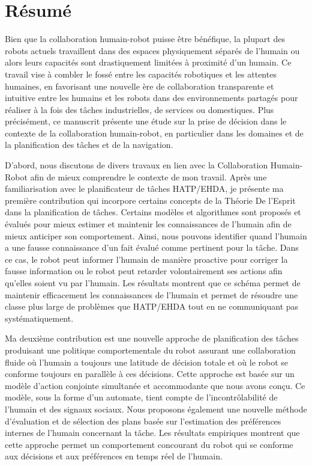 \chapter*{Résumé}

Bien que la collaboration humain-robot puisse être bénéfique, la plupart des robots actuels travaillent dans des espaces physiquement séparés de l'humain ou alors leurs capacités sont drastiquement limitées à proximité d'un humain. Ce travail vise à combler le fossé entre les capacités robotiques et les attentes humaines, en favorisant une nouvelle ère de collaboration transparente et intuitive entre les humains et les robots dans des environnements partagés pour réaliser à la fois des tâches industrielles, de services ou domestiques. Plus précisément, ce manuscrit présente une étude sur la prise de décision dans le contexte de la collaboration humain-robot, en particulier dans les domaines et de la planification des tâches et de la navigation.

D'abord, nous discutons de divers travaux en lien avec la Collaboration Humain-Robot afin de mieux comprendre le contexte de mon travail. Après une familiarisation avec le planificateur de tâches HATP/EHDA, je présente ma première contribution qui incorpore certains concepts de la Théorie De l'Esprit dans la planification de tâches. Certains modèles et algorithmes sont proposés et évalués pour mieux estimer et maintenir les connaissances de l'humain afin de mieux anticiper son comportement. Ainsi, nous pouvons identifier quand l'humain a une fausse connaissance d'un fait évalué comme pertinent pour la tâche. Dans ce cas, le robot peut informer l'humain de manière proactive pour corriger la fausse information ou le robot peut retarder volontairement ses actions afin qu'elles soient vu par l'humain. Les résultats montrent que ce schéma permet de maintenir efficacement les connaissances de l'humain et permet de résoudre une classe plus large de problèmes que HATP/EHDA tout en ne communiquant pas systématiquement.

Ma deuxième contribution est une nouvelle approche de planification des tâches produisant une politique comportementale du robot assurant une collaboration fluide où l'humain a toujours une latitude de décision totale et où le robot se conforme toujours en parallèle à ces décisions. Cette approche est basée sur un modèle d'action conjointe simultanée et accommodante que nous avons conçu. Ce modèle, sous la forme d'un automate, tient compte de l'incontrôlabilité de l'humain et des signaux sociaux. Nous proposons également une nouvelle méthode d'évaluation et de sélection des plans basée sur l'estimation des préférences internes de l'humain concernant la tâche. Les résultats empiriques montrent que cette approche permet un comportement concourant du robot qui se conforme aux décisions et aux préférences en temps réel de l'humain.

